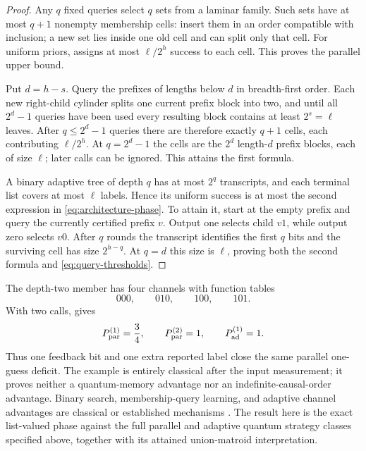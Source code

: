 \documentclass[11pt]{article}
\theoremstyle{definition}
\theoremstyle{remark}
\begin{document}
\begin{proof}
Any $q$ fixed queries select $q$ sets from a laminar family.  Such sets have
at most $q+1$ nonempty membership cells: insert them in an order compatible
with inclusion; a new set lies inside one old cell and can split only that
cell.  For uniform priors,  assigns at most
$\ell/2^h$ success to each cell.  This proves the parallel upper bound.

Put $d=h-s$.  Query the prefixes of lengths below $d$ in breadth-first order.
Each new right-child cylinder splits one current prefix block into two, and
until all $2^d-1$ queries have been used every resulting block contains at
least $2^s=\ell$ leaves.  After $q\leq2^d-1$ queries there are therefore
exactly $q+1$ cells, each contributing $\ell/2^h$.  At $q=2^d-1$ the cells
are the $2^d$ length-$d$ prefix blocks, each of size $\ell$; later calls can
be ignored.  This attains the first formula.

A binary adaptive tree of depth $q$ has at most $2^q$ transcripts, and each
terminal list covers at most $\ell$ labels.  Hence its uniform success is at
most the second expression in \eqref{eq:architecture-phase}.  To attain it,
start at the empty prefix and query the currently certified prefix $v$.
Output one selects child $v1$, while output zero selects $v0$.  After $q$
rounds the transcript identifies the first $q$ bits and the surviving cell
has size $2^{h-q}$.  At $q=d$ this size is $\ell$, proving both the second
formula and \eqref{eq:query-thresholds}.
\end{proof}

The depth-two member has four channels with function tables
\[
 000,\qquad010,\qquad100,\qquad101.
\]
With two calls,  gives
\begin{equation}\label{eq:feedback-list-tradeoff}
 P_{\rm par}^{(1)}=\frac34,\qquad
 P_{\rm par}^{(2)}=1,\qquad
 P_{\rm ad}^{(1)}=1.
\end{equation}
Thus one feedback bit and one extra reported label close the same parallel
one-guess deficit.  The example is entirely classical after the input
measurement; it proves neither a quantum-memory advantage nor an
indefinite-causal-order advantage.  Binary search, membership-query learning,
and adaptive channel advantages are classical or established mechanisms
\cite{angluin1988,harrow2010}.  The result here is the exact list-valued phase
against the full parallel and adaptive quantum strategy classes specified
above, together with its attained union-matroid interpretation.
\end{document}
